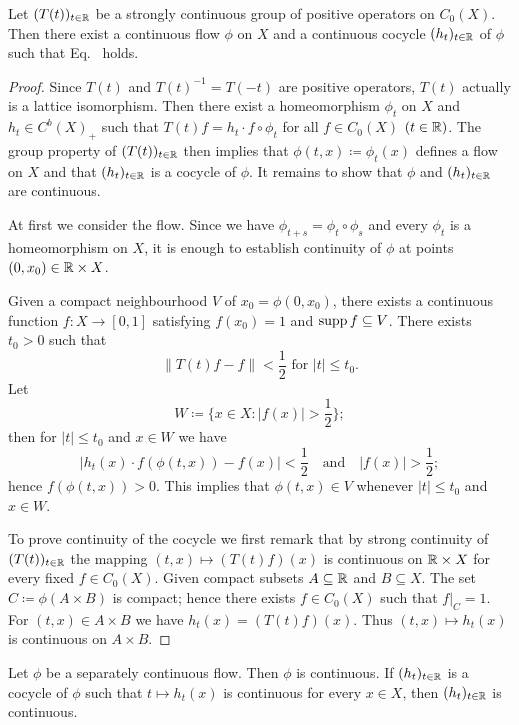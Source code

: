 \begin{proposition}\label{prop:b2-3.9}
Let $(T(t))_{t \in \mathbb{R}}$ be a strongly continuous group of positive operators on $C_0(X)$.
Then there exist a continuous flow $\phi$ on $X$ and a continuous cocycle $(h_t)_{t \in \mathbb{R}}$ of\/ $\phi$ such that Eq.~ holds.
\end{proposition}
\begin{proof}
Since $T(t)$ and $T(t)^{-1} = T(-t)$ are positive operators, $T(t)$ actually is a lattice isomorphism.
Then there exist a homeomorphism $\phi_t$ on $X$ and $h_t \in C^{b}(X)_+$ such that $T(t)f = h_t \cdot f \circ \phi_t$ for all $f \in C_0(X)$ $(t \in \mathbb{R})$.
The group property of\/ $(T(t))_{t \in \mathbb{R}}$ then implies that $\phi(t,x) \coloneq \phi_t(x)$ defines a flow on $X$ and that $(h_t)_{t \in \mathbb{R}}$ is a cocycle of\/ $\phi$.
It remains to show that $\phi$ and $(h_t)_{t \in \mathbb{R}}$ are continuous.

At first we consider the flow.
Since we have $\phi_{t+s} = \phi_t \circ \phi_s$ and every $\phi_t$ is a homeomorphism on $X$, it is enough to establish continuity of\/ $\phi$ at points $(0,x_0) \in \mathbb{R} \times X$.

Given a compact neighbourhood $V$ of\/ $x_0 = \phi (0,x_0)$, there exists a continuous function $f \colon X \to [0,1]$ satisfying $f(x_0) = 1$ and $\mathop{}\!\mathrm{supp}\, f \subseteq V$.
There exists $t_0 > 0$ such that 
%
\[
	\|T(t)f - f\| < \frac{1}{2} \text{ for  $|t| \leq t_0$}.
\]
%
Let 
%
\[
	W \coloneq \{x \in X \colon |f(x)| > \frac{1}{2}\};
\]
%
then for $|t| \leq t_0$ and $x \in W$ we have 
%
\[
	|h_t(x) \cdot f(\phi(t,x)) - f(x)| < \frac{1}{2} \quad \text{and} \quad |f(x)| > \frac{1}{2};
\]
%
hence $f(\phi (t,x)) > 0$.
This implies that $\phi (t,x) \in V$ whenever $|t| \leq t_0$ and $x \in W$.

To prove continuity of the cocycle we first remark that by strong continuity of\/ $(T(t))_{t \in \mathbb{R}}$ 
the mapping $(t,x) \mapsto (T(t)f) (x)$ is continuous on $\mathbb{R} \times X$ for every fixed $f \in C_0(X)$.
Given compact subsets $A \subseteq \mathbb{R} $ and $B \subseteq X$.
The set $C \coloneq \phi(A \times B)$ is compact; hence there exists $f \in C_0(X)$ such that $f|_{C} = 1$.
For $(t,x) \in A \times B$ we have $h_t(x) = (T(t)f) (x)$.
Thus $(t,x) \mapsto h_t(x)$ is continuous on $A \times B$.
\end{proof}
\begin{corollary}\label{cor:b2-3.10}
Let $\phi$ be a separately continuous flow.
Then $\phi$ is continuous.
If\/ $(h_t)_{t \in \mathbb{R}}$ is a cocycle of\/ $\phi$ such that $t \mapsto h_t (x)$ is continuous for every $x \in X$, then $(h_t)_{t \in \mathbb{R}}$ is continuous.
\end{corollary}
